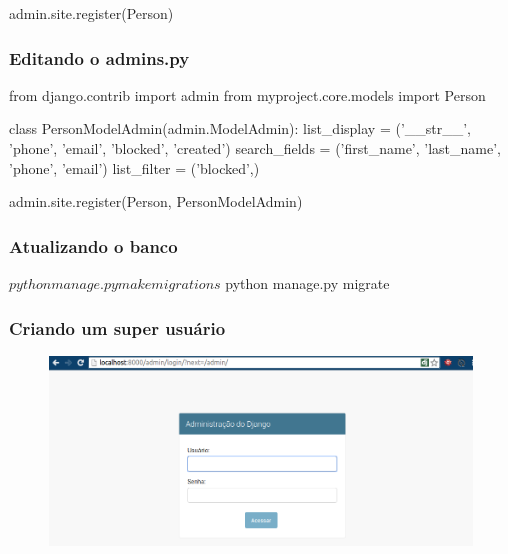 \documentclass{beamer}
\begin{document}
{\begin{frame}[fragile]
\begin{pythoncode}
admin.site.register(Person)
\end{pythoncode}

\end{frame}

\begin{frame}[fragile]\frametitle{Editando o admins.py}

\begin{pythoncode}
from django.contrib import admin
from myproject.core.models import Person

class PersonModelAdmin(admin.ModelAdmin):
    list_display = ('__str__', 'phone', 'email',
                    'blocked', 'created')
    search_fields = ('first_name', 'last_name',
                     'phone', 'email')
    list_filter = ('blocked',)

admin.site.register(Person, PersonModelAdmin)
\end{pythoncode}

\end{frame}

\begin{frame}[fragile]\frametitle{Atualizando o banco}

\begin{bashcode}
$ python manage.py makemigrations
$ python manage.py migrate
\end{bashcode}

\end{frame}

\begin{frame}[fragile]\frametitle{Criando um super usuário}


\end{frame}


\begin{frame}

    \begin{figure}[h]
      \centering
        \includegraphics[width=\paperwidth]{img/admin1.png}
    \end{figure}


\end{frame}}
\end{document}
